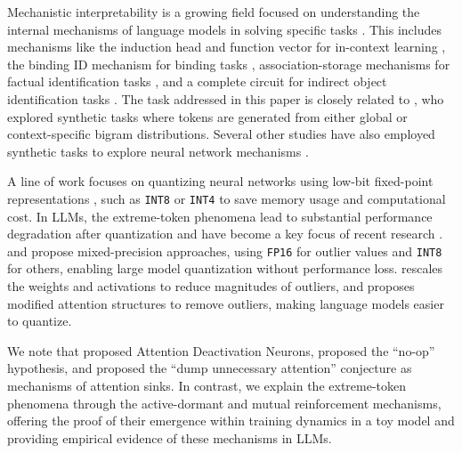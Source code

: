 Mechanistic interpretability is a growing field focused on understanding the internal mechanisms of language models in solving specific tasks \citep{elhage2021mathematical, geva2023dissecting, meng2022locating, nanda2023progress, olsson2022context, bietti2024birth, wang2022interpretability, feng2023language, todd2023function}. This includes mechanisms like the induction head and function vector for in-context learning \citep{elhage2021mathematical, olsson2022context, todd2023function, bietti2024birth}, the binding ID mechanism for binding tasks \citep{feng2023language}, association-storage mechanisms for factual identification tasks \citep{meng2022locating}, and a complete circuit for indirect object identification tasks \citep{wang2022interpretability}. The task addressed in this paper is closely related to \cite{bietti2024birth}, who explored synthetic tasks where tokens are generated from either global or context-specific bigram distributions. Several other studies have also employed synthetic tasks to explore neural network mechanisms \citep{charton2022my, liu2022towards, nanda2023progress, allen2023physics, zhu2023physics, guo2023transformers, zhang2022unveiling, lin2023transformers}. 

A line of work focuses on quantizing neural networks using low-bit fixed-point representations \citep{jacob2018quantization,zafrir2019q8bert,lin2020towards,nagel2021white,gholami2022survey}, such as \texttt{INT8} \citep{lin2020towards,dettmers2022gpt3} or \texttt{INT4} \citep{yao2206efficient,wu2023understanding,dettmers2023case} to save memory usage and computational cost. In LLMs, the extreme-token phenomena lead to substantial performance degradation after quantization \citep{bondarenko2021understanding} and have become a key focus of recent research \citep{fan2020training,yao2022zeroquant,lin2024duquant,hu2024outlier}. \citet{dettmers2022gpt3} and \citet{lin2024awq} propose mixed-precision approaches, using \texttt{FP16} for outlier values and \texttt{INT8} for others, enabling large model quantization without performance loss. \citet{xiao2023smoothquant} rescales the weights and activations to reduce magnitudes of outliers, and \citet{bondarenko2023quantizable} proposes modified attention structures to remove outliers, making language models easier to quantize. 


We note that \citet{gurnee2024universal} proposed Attention Deactivation Neurons, \citet{bondarenko2023quantizable} proposed the ``no-op'' hypothesis, and \citet{xiao2023efficient} proposed the ``dump unnecessary attention'' conjecture as mechanisms of attention sinks. In contrast, we explain the extreme-token phenomena through the active-dormant and mutual reinforcement mechanisms, offering the proof of their emergence within training dynamics in a toy model and providing empirical evidence of these mechanisms in LLMs.



